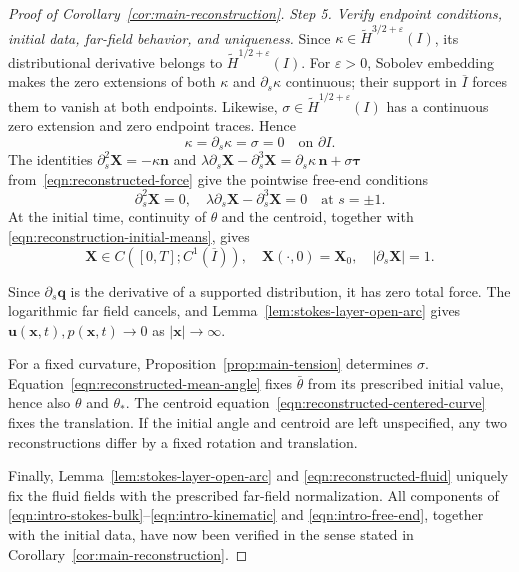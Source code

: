 \documentclass[11pt,reqno]{amsart}
\theoremstyle{plain}
\theoremstyle{definition}
\numberwithin{equation}{section}
\newcommand{\paren}[1]{\left(#1\right)}
\newcommand{\p}{\partial}
\newcommand{\wt}[1]{\widetilde{#1}}
\newcommand{\bm}[1]{\boldsymbol{#1}}
\newcommand{\abs}[1]{\left\lvert #1 \right\rvert}
\newcommand{\thi}[1]{\wt H^{#1}(I)}
\begin{document}
\begin{proof}[Proof of Corollary~\ref{cor:main-reconstruction}]
\emph{Step 5. Verify endpoint conditions, initial data, far-field behavior,
and uniqueness.}
Since $\kappa\in\thi{3/2+\varepsilon}$, its distributional derivative
belongs to $\thi{1/2+\varepsilon}$. For $\varepsilon>0$, Sobolev
embedding makes the zero extensions of both $\kappa$ and $\p_s\kappa$
continuous; their support in $\overline I$ forces them to vanish at
both endpoints. Likewise, $\sigma\in\thi{1/2+\varepsilon}$ has a
continuous zero extension and zero endpoint traces. Hence
\begin{equation}
    \kappa=\p_s\kappa=\sigma=0\quad\text{on }\p I.
\end{equation}
The identities $\p_s^2\bm X=-\kappa\bm n$ and
$\lambda\p_s\bm X-\p_s^3\bm X=\p_s\kappa\,\bm n+\sigma\bm\tau$
from~\eqref{eqn:reconstructed-force} give the pointwise free-end conditions
\begin{equation}
    \p_s^2\bm X=0,\quad
    \lambda\p_s\bm X-\p_s^3\bm X=0
    \quad\text{at }s=\pm1.
\end{equation}
At the initial time, continuity of $\theta$ and the centroid, together
with \eqref{eqn:reconstruction-initial-means}, gives
\begin{equation}\label{eqn:main-X-regularity}
    \bm X\in C\paren{[0,T];C^1(\overline I)},\quad
    \bm X(\cdot,0)=\bm X_0,\quad
    \abs{\p_s\bm X}=1.
\end{equation}

Since $\p_s\bm q$ is the derivative of a supported distribution, it has
zero total force. The logarithmic far field cancels, and
Lemma~\ref{lem:stokes-layer-open-arc} gives
$\bm u(\bm x,t),p(\bm x,t)\to0$ as $\abs{\bm x}\to\infty$.

For a fixed curvature, Proposition~\ref{prop:main-tension} determines
$\sigma$. Equation~\eqref{eqn:reconstructed-mean-angle} fixes $\bar\theta$ from its prescribed
initial value, hence also $\theta$ and $\theta_*$.
The centroid equation~\eqref{eqn:reconstructed-centered-curve} fixes the
translation. If the initial angle and centroid are left unspecified,
any two reconstructions differ by a fixed rotation and translation.

Finally, Lemma~\ref{lem:stokes-layer-open-arc} and
\eqref{eqn:reconstructed-fluid} uniquely fix the fluid fields with the
prescribed far-field normalization. All components of
\eqref{eqn:intro-stokes-bulk}--\eqref{eqn:intro-kinematic} and
\eqref{eqn:intro-free-end}, together with the initial data, have now been
verified in the sense stated in Corollary~\ref{cor:main-reconstruction}.
\end{proof}
\end{document}
